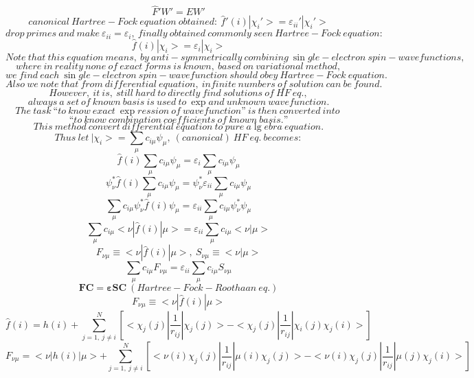 $$
\hat{F}'W'=EW'
$$
$$
canonical\ Hartree-Fock\ equation\ obtained:\ \hat{f}'\left( i \right) |\chi _i'>=\varepsilon _{ii}'|\chi _i'>
$$
$$
drop\ primes\ and\ make\ \varepsilon _{ii}=\varepsilon _i,\ finally\ obtained\ commonly\ seen\ Hartree-Fock\ equation:
$$
$$
\hat{f}\left( i \right) |\chi _i>=\varepsilon _i|\chi _i>
$$
$$
Note\ that\ this\ equation\ means,\ by\ anti-symmetrically\ combining\ \sin gle-electron\ spin-wavefunctions,
$$
$$
where\ in\ reality\ none\ of\ exact\ forms\ is\ known,\ based\ on\ variational\ method,
$$
$$
we\ find\ each\ \sin gle-electron\ spin-wavefunction\ should\ obey\ Hartree-Fock\ equation.
$$
$$
Also\ we\ note\ that\ from\ differential\ equation,\ infinite\ numbers\ of\ solution\ can\ be\ found.
$$
$$
However,\ it\ is,\ still\ hard\ to\ directly\ find\ solutions\ of\ HF\ eq.,
$$
$$
always\ a\ set\ of\ known\ basis\ is\ used\ to\ \exp and\ unknown\ wavefunction.
$$
$$
The\ task\ to\ know\ exact\ \exp ression\ of\ wavefunction\ is\ then\ converted\ into\ 
$$
$$
to\ know\ combination\ coefficients\ of\ known\ basis.
$$
$$
This\ method\ convert\ differential\ equation\ to\ pure\ a\lg ebra\ equation.
$$
$$
Thus\ let\ |\chi _i>=\sum_{\mu}{c_{i\mu}\psi _{\mu}},\ \left( canonical \right) \ HF\ eq.\ becomes:
$$
$$
\hat{f}\left( i \right) \sum_{\mu}{c_{i\mu}\psi _{\mu}}=\varepsilon _i\sum_{\mu}{c_{i\mu}\psi _{\mu}}
$$
$$
\psi _{\nu}^{*}\hat{f}\left( i \right) \sum_{\mu}{c_{i\mu}\psi _{\mu}}=\psi _{\nu}^{*}\varepsilon _{ii}\sum_{\mu}{c_{i\mu}\psi _{\mu}}
$$
$$
\sum_{\mu}{c_{i\mu}\psi _{\nu}^{*}\hat{f}\left( i \right) \psi _{\mu}}=\varepsilon _{ii}\sum_{\mu}{c_{i\mu}\psi _{\nu}^{*}\psi _{\mu}}
$$
$$
\sum_{\mu}{c_{i\mu}<\nu |\hat{f}\left( i \right) |\mu >}=\varepsilon _{ii}\sum_{\mu}{c_{i\mu}<\nu |\mu >}
$$
$$
F_{\nu \mu}\equiv <\nu |\hat{f}\left( i \right) |\mu >,\ S_{\nu \mu}\equiv <\nu |\mu >
$$
$$
\sum_{\mu}{c_{i\mu}F_{\nu \mu}}=\varepsilon _{ii}\sum_{\mu}{c_{i\mu}S_{\nu \mu}}
$$
$$
\mathbf{FC}=\mathbf{\varepsilon SC\ }\left( Hartree-Fock-Roothaan\ eq. \right) 
$$
$$
F_{\nu \mu}\equiv <\nu |\hat{f}\left( i \right) |\mu >
$$
$$
\hat{f}\left( i \right) =h\left( i \right) +\sum_{j=1,\ j\ne i}^N{\left[ <\chi _j\left( j \right) |\frac{1}{r_{ij}}|\chi _j\left( j \right) >-<\chi _j\left( j \right) |\frac{1}{r_{ij}}|\chi _i\left( j \right) \chi _j\left( i \right) > \right]}
$$
$$
F_{\nu \mu}=<\nu |h\left( i \right) |\mu >+\sum_{j=1,\ j\ne i}^N{\left[ <\nu \left( i \right) \chi _j\left( j \right) |\frac{1}{r_{ij}}|\mu \left( i \right) \chi _j\left( j \right) >-<\nu \left( i \right) \chi _j\left( j \right) |\frac{1}{r_{ij}}|\mu \left( j \right) \chi _j\left( i \right) > \right]}
$$
